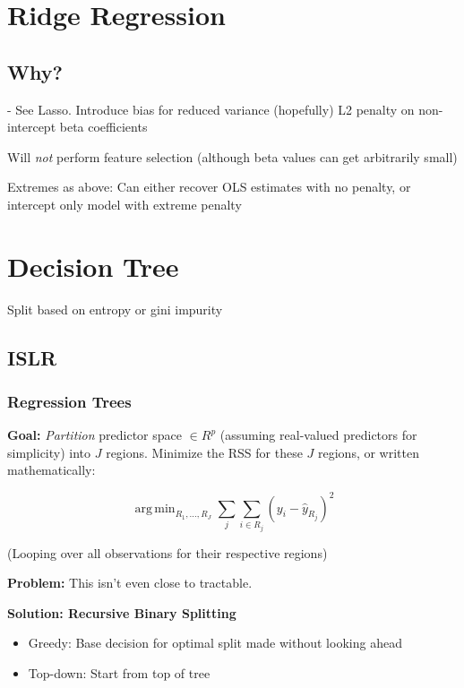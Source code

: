 \documentclass{article}
\DeclareMathOperator*{\argmin}{arg\,min}
\begin{document}
\section{Ridge Regression}

\subsection{Why?}
	- See Lasso. Introduce bias for reduced variance (hopefully)
L2 penalty on non-intercept beta coefficients

Will \textit{not} perform feature selection (although beta values can get arbitrarily small)

Extremes as above: Can either recover OLS estimates with no penalty, or intercept only model with extreme penalty

\section{Decision Tree}

Split based on entropy or gini impurity

\subsection{ISLR}

\subsubsection{Regression Trees}

\textbf{Goal:} \textit{Partition} predictor space $\in R^p$ (assuming real-valued predictors for simplicity) into $J$ regions. Minimize the RSS for these $J$ regions, or written mathematically:

\begin{equation*}
	\argmin_{R_1, \ldots, R_J} \sum_j \sum_{i \in R_j} (y_i - \hat{y}_{R_j})^2
\end{equation*}

(Looping over all observations for their respective regions)

\textbf{Problem:} This isn't even close to tractable.

\textbf{Solution: Recursive Binary Splitting}

\begin{itemize}
	\item Greedy: Base decision for optimal split made without looking ahead
	\item Top-down: Start from top of tree
\end{itemize}
\end{document}
